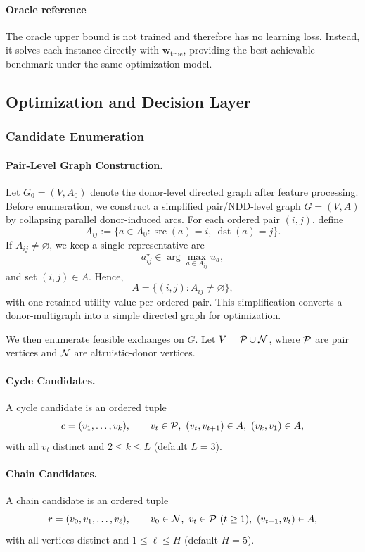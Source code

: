 \documentclass{article}
\begin{document}
\paragraph{Oracle reference}
The oracle upper bound is not trained and therefore has no learning loss. Instead, it solves each instance directly with \(\mathbf w_{\mathrm{true}}\), providing the best achievable benchmark under the same optimization model.

\subsection{Optimization and Decision Layer}

\subsubsection{Candidate Enumeration}
\paragraph{Pair-Level Graph Construction.}
Let \(G_0=(V,A_0)\) denote the donor-level directed graph after feature processing. Before enumeration, we construct a simplified pair/NDD-level graph \(G=(V,A)\) by collapsing parallel donor-induced arcs. For each ordered pair \((i,j)\), define
\[
A_{ij}:=\{a\in A_0:\operatorname{src}(a)=i,\ \operatorname{dst}(a)=j\}.
\]
If \(A_{ij}\neq\varnothing\), we keep a single representative arc
\[
a_{ij}^{\star}\in\arg\max_{a\in A_{ij}} u_a,
\]
and set \((i,j)\in A\). Hence,
\[
A=\{(i,j):A_{ij}\neq\varnothing\},
\]
with one retained utility value per ordered pair. This simplification converts a donor-multigraph into a simple directed graph for optimization.

We then enumerate feasible exchanges on \(G\). Let \(V=\mathcal{P}\cup\mathcal{N}\), where \(\mathcal{P}\) are pair vertices and \(\mathcal{N}\) are altruistic-donor vertices.

\paragraph{Cycle Candidates.}
A cycle candidate is an ordered tuple
\[
c=(v_1,\dots,v_k),\qquad v_t\in\mP,\ (v_t,v_{t+1})\in A,\ (v_k,v_1)\in A,
\]
with all \(v_t\) distinct and \(2\le k\le L\) (default \(L=3\)).

\paragraph{Chain Candidates.}
A chain candidate is an ordered tuple
\[
r=(v_0,v_1,\dots,v_\ell),\qquad v_0\in\mN,\ v_t\in\mP\ (t\ge1),\ (v_{t-1},v_t)\in A,
\]
with all vertices distinct and \(1\le \ell\le H\) (default \(H=5\)).
\end{document}
